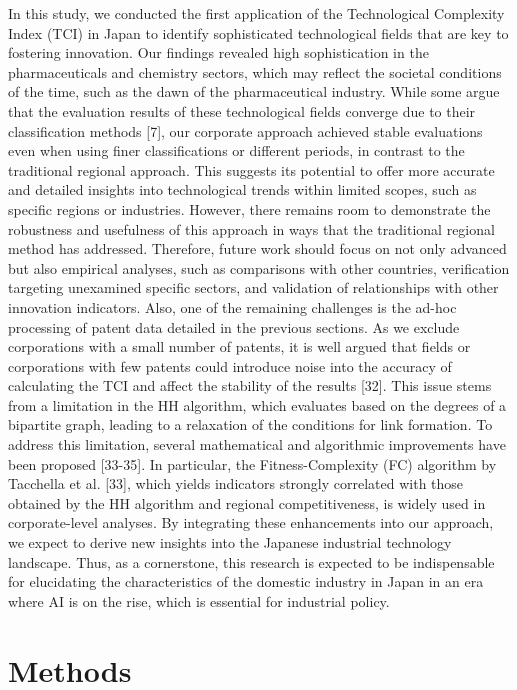 \documentclass[fleqn,10pt]{wlscirep}
\begin{document}
In this study, we conducted the first application of the Technological Complexity Index (TCI) in Japan to identify sophisticated technological fields that are key to fostering innovation. Our findings revealed high sophistication in the pharmaceuticals and chemistry sectors, which may reflect the societal conditions of the time, such as the dawn of the pharmaceutical industry. While some argue that the evaluation results of these technological fields converge due to their classification methods [7], our corporate approach achieved stable evaluations even when using finer classifications or different periods, in contrast to the traditional regional approach. This suggests its potential to offer more accurate and detailed insights into technological trends within limited scopes, such as specific regions or industries. However, there remains room to demonstrate the robustness and usefulness of this approach in ways that the traditional regional method has addressed. Therefore, future work should focus on not only advanced but also empirical analyses, such as comparisons with other countries, verification targeting unexamined specific sectors, and validation of relationships with other innovation indicators.
Also, one of the remaining challenges is the ad-hoc processing of patent data detailed in the previous sections. As we exclude corporations with a small number of patents, it is well argued that fields or corporations with few patents could introduce noise into the accuracy of calculating the TCI and affect the stability of the results [32]. This issue stems from a limitation in the HH algorithm, which evaluates based on the degrees of a bipartite graph, leading to a relaxation of the conditions for link formation. To address this limitation, several mathematical and algorithmic improvements have been proposed [33-35]. In particular, the Fitness-Complexity (FC) algorithm by Tacchella et al. [33], which yields indicators strongly correlated with those obtained by the HH algorithm and regional competitiveness, is widely used in corporate-level analyses. By integrating these enhancements into our approach, we expect to derive new insights into the Japanese industrial technology landscape. Thus, as a cornerstone, this research is expected to be indispensable for elucidating the characteristics of the domestic industry in Japan in an era where AI is on the rise, which is essential for industrial policy.


\section*{Methods}
\end{document}

